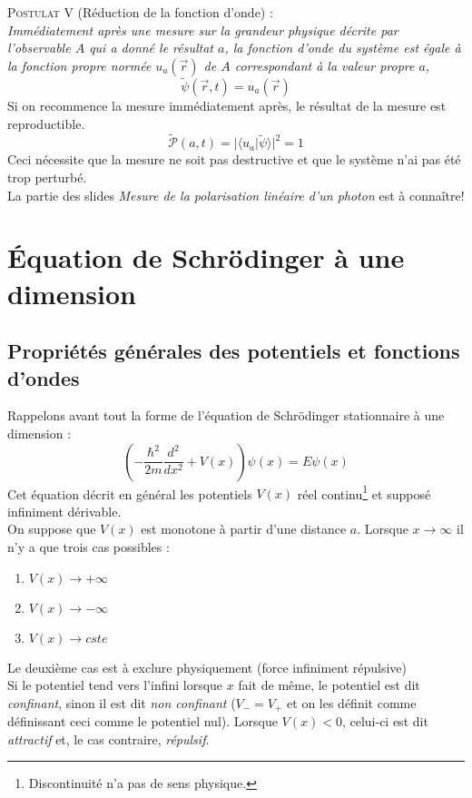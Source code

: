 \documentclass[british,french,11pt, a4paper, openany]{book}
\begin{document}
	\textsc{Postulat V} (Réduction de la fonction d'onde) :\\
	\textit{Immédiatement après une mesure sur la grandeur physique décrite par l'observable $A$ qui a donné le résultat $a$, la fonction d'onde du système est égale à la fonction propre normée $u_a(\vec{r})$ de $A$ correspondant à la valeur propre $a$,}
	\begin{equation}
		\tilde{\psi}(\vec{r},t) = u_a(\vec{r})
	\end{equation}
	Si on recommence la mesure immédiatement après, le résultat de la mesure est reproductible.
	\begin{equation}
		\tilde{\mathcal{P}}(a,t) = |\langle u_a|\tilde{\psi}\rangle |^2 = 1
	\end{equation}
	Ceci nécessite que la mesure ne soit pas destructive et que le système n'ai pas été trop perturbé.\\
	
	La partie des slides \textit{Mesure de la polarisation linéaire d'un photon} est à connaître! 
	
	
	
	
	\chapter{Équation de Schrödinger à une dimension}
	\section{Propriétés générales des potentiels et fonctions d'ondes}
	\label{chap:5.1}
	Rappelons avant tout la forme de l'équation de Schrödinger stationnaire à une dimension : 
	\begin{equation}\label{eq:5.1}
		\left(-\frac{\hbar^2}{2m}\frac{d^2}{dx^2} + V(x)\right)\psi(x) = E\psi(x)
	\end{equation}
	Cet équation décrit en général les potentiels $V(x)$ réel continu\footnote{Discontinuité n'a pas de sens physique.} et supposé infiniment dérivable.\\
	
	On suppose que $V(x)$ est monotone à partir d'une distance $a$. Lorsque $x \rightarrow \infty$ il n'y a que trois cas possibles :
	\begin{enumerate}
		\item $V(x) \rightarrow +\infty$
		\item $V(x) \rightarrow -\infty$
		\item $V(x) \rightarrow cste$
	\end{enumerate}
	Le deuxième cas est à exclure physiquement (force infiniment répulsive)\\
	Si le potentiel tend vers l'infini lorsque $x$ fait de même, le potentiel est dit \textit{confinant}, sinon il est dit \textit{non confinant} ($V_- =V_+$ et on les définit comme définissant ceci comme le potentiel nul). Lorsque $V(x) < 0$, celui-ci est dit \textit{attractif} et, le cas contraire, \textit{répulsif}.\\
	
\end{document}
